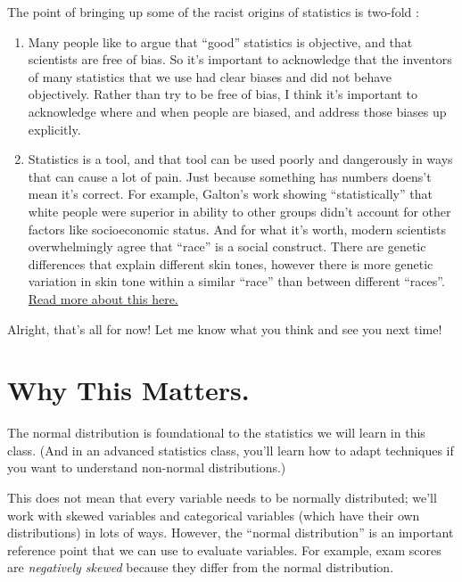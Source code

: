 \documentclass[
  letterpaper,
  DIV=11,
  numbers=noendperiod,
  oneside]{scrreprt}
\providecommand{\tightlist}{%
  \setlength{\itemsep}{0pt}\setlength{\parskip}{0pt}}\usepackage{longtable,booktabs,array}
\begin{document}
\begin{tcolorbox}
The point of bringing up some of the racist origins of statistics is
two-fold :

\begin{enumerate}
\def\labelenumi{\arabic{enumi}.}
\tightlist
\item
  Many people like to argue that ``good'' statistics is objective, and
  that scientists are free of bias. So it's important to acknowledge
  that the inventors of many statistics that we use had clear biases and
  did not behave objectively. Rather than try to be free of bias, I
  think it's important to acknowledge where and when people are biased,
  and address those biases up explicitly.
\item
  Statistics is a tool, and that tool can be used poorly and dangerously
  in ways that can cause a lot of pain. Just because something has
  numbers doens't mean it's correct. For example, Galton's work showing
  ``statistically'' that white people were superior in ability to other
  groups didn't account for other factors like socioeconomic status. And
  for what it's worth, modern scientists overwhelmingly agree that
  ``race'' is a social construct. There are genetic differences that
  explain different skin tones, however there is more genetic variation
  in skin tone within a similar ``race'' than between different
  ``races''.
  \href{https://www.smithsonianmag.com/smart-news/genetic-study-shows-skin-color-just-skin-deep-180965261/}{Read
  more about this here.}
\end{enumerate}

Alright, that's all for now! Let me know what you think and see you next
time!

\end{tcolorbox}


\section{Why This Matters.}\label{why-this-matters.}

The normal distribution is foundational to the statistics we will learn
in this class. (And in an advanced statistics class, you'll learn how to
adapt techniques if you want to understand non-normal distributions.)

This does not mean that every variable needs to be normally distributed;
we'll work with skewed variables and categorical variables (which have
their own distributions) in lots of ways. However, the ``normal
distribution'' is an important reference point that we can use to
evaluate variables. For example, exam scores are \emph{negatively
skewed} because they differ from the normal distribution.
\end{document}
